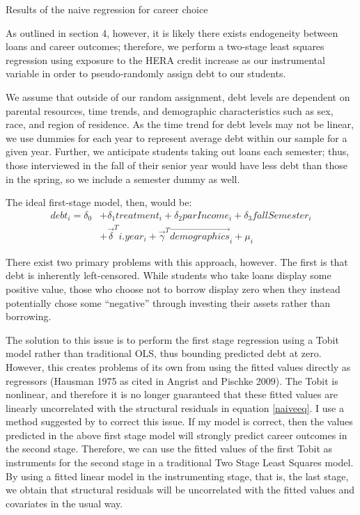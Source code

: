 \documentclass[12pt]{article}
\newcommand{\regs}{../Analysis/Regressions/Output/}
\begin{document}
	\begin{table}
		\centering
		\caption{Results of the naive regression for career choice}
		
		\label{naive2}
	\end{table}
	
	As outlined in section 4, however, it is likely there exists endogeneity between loans and career outcomes; therefore, we perform a two-stage least squares regression using exposure to the HERA credit increase as our instrumental variable in order to pseudo-randomly assign debt to our students. 
	
	We assume that outside of our random assignment, debt levels are dependent on parental resources, time trends, and demographic characteristics such as sex, race, and region of residence. As the time trend for debt levels may not be linear, we use dummies for each year to represent average debt within our sample for a given year. Further, we anticipate students taking out loans each semester; thus, those interviewed in the fall of their senior year would have less debt than those in the spring, so we include a semester dummy as well.
	
	The ideal first-stage model, then, would be: 
	\begin{equation}
	\begin{aligned}
	debt_i = \delta_0 &+ \delta_1 treatment_i + \delta_2 parIncome_i + \delta_3 fallSemester_i \\
	&+ \vec{\delta}^T i.year_i + \vec{\gamma}^T \vec{demographics}_i + \mu_i \label{fseq}
	\end{aligned}
	\end{equation}
	
	There exist two primary problems with this approach, however. The first is that debt is inherently left-censored. While students who take loans display some positive value, those who choose not to borrow display zero when they instead potentially chose some ``negative'' through investing their assets rather than borrowing. 
	
	The solution to this issue is to perform the first stage regression using a Tobit model rather than traditional OLS, thus bounding predicted debt at zero. However, this creates problems of its own from using the fitted values directly as regressors (Hausman 1975 as cited in Angrist and Pischke 2009).	 The Tobit is nonlinear, and therefore it is no longer guaranteed that these fitted values are linearly uncorrelated with the structural residuals in equation \ref{naiveeq}. I use a method suggested by \textcite{angrist2009} to correct this issue. If my model is correct, then the values predicted in the above first stage model will strongly predict career outcomes in the second stage. Therefore, we can use the fitted values of the first Tobit as instruments for the second stage in a traditional Two Stage Least Squares model. By using a fitted linear model in the instrumenting stage, that is, the last stage, we obtain that structural residuals will be uncorrelated with the fitted values and covariates in the usual way. 
	
\end{document}
